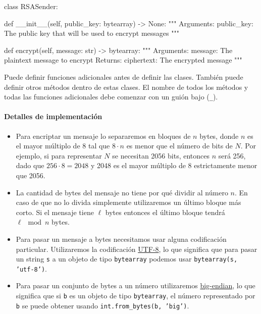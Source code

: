\begin{python}
  class RSASender:
    
    def __init__(self, public_key: bytearray) -> None:
    """
    Arguments:
      public_key: The public key that will be used to encrypt messages
    """

    def encrypt(self, message: str) -> bytearray:
    """
    Arguments:
      message: The plaintext message to encrypt
    Returns:
      ciphertext: The encrypted message
    """
\end{python}

Puede definir funciones adicionales antes de definir las clases. También puede definir otros métodos dentro de estas clases. El nombre de todos los métodos y todas las funciones adicionales debe comenzar con un guión bajo (\texttt{\_}).

\paragraph{Detalles de implementación}
\begin{itemize}
  \item Para encriptar un mensaje lo separaremos en bloques de $n$ bytes, donde $n$ es el mayor múltiplo de 8 tal que $8\cdot n$ es menor que el número de bits de $N$. Por ejemplo, si para representar $N$ se necesitan 2056 bits, entonces $n$ será 256, dado que $256\cdot 8=2048$ y 2048 es el mayor múltiplo de 8 estrictamente menor que 2056.
  \item La cantidad de bytes del mensaje no tiene por qué dividir al número $n$. En caso de que no lo divida simplemente utilizaremos un último bloque más corto. Si el mensaje tiene $\ell$ bytes entonces el último bloque tendrá $\ell\mod n$ bytes.
  \item Para pasar un mensaje a bytes necesitamos usar alguna codificación particular. Utilizaremos la codificación \href{https://en.wikipedia.org/wiki/UTF-8}{UTF-8}, lo que significa que para pasar un string \texttt{s} a un objeto de tipo \texttt{bytearray} podemos usar \texttt{bytearray(s, 'utf-8')}.
  \item Para pasar un conjunto de bytes a un número utilizaremos \href{https://en.wikipedia.org/wiki/Endianness#Overview}{big-endian}, lo que significa que si \texttt{b} es un objeto de tipo \texttt{bytearray}, el número representado por \texttt{b} se puede obtener usando \texttt{int.from\_bytes(b, 'big')}.
\end{itemize}
